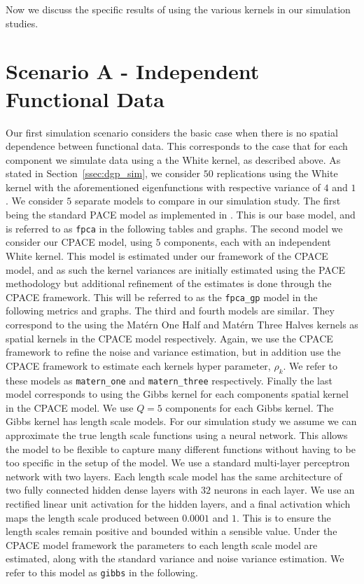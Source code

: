 Now we discuss the specific results of using the various kernels in our simulation studies. 

\section{Scenario A - Independent Functional Data \label{sec:sim_A}}
Our first simulation scenario considers the basic case when there is no spatial dependence between functional data.
This corresponds to the case that for each component we simulate data using a the White kernel, as described above.
As stated in Section~\ref{ssec:dgp_sim}, we consider $50$ replications using the White kernel with the aforementioned eigenfunctions with respective variance of $4$ and $1$. 
We consider $5$ separate models to compare in our simulation study.
The first being the standard PACE model as implemented in \citep{yao_functional_2005}.
This is our base model, and is referred to as \verb*|fpca| in the following tables and graphs. 
The second model we consider our CPACE model, using $5$ components, each with an independent White kernel.
This model is estimated under our framework of the CPACE model, and as such the kernel variances are initially estimated using the PACE methodology but additional refinement of the estimates is done through the CPACE framework.
This will be referred to as the \verb*|fpca_gp| model in the following metrics and graphs.
The third and fourth models are similar.
They correspond to the using the Mat\'ern One Half and Mat\'ern Three Halves kernels as spatial kernels in the CPACE model respectively.
Again, we use the CPACE framework to refine the noise and variance estimation, but in addition use the CPACE framework to estimate each kernels hyper parameter, $\rho_k$.
We refer to these models as \verb*|matern_one| and \verb*|matern_three| respectively.
Finally the last model corresponds to using the Gibbs kernel for each components spatial kernel in the CPACE model.
We use $Q=5$ components for each Gibbs kernel.
The Gibbs kernel has length scale models.
For our simulation study we assume we can approximate the true length scale functions using a neural network.
This allows the model to be flexible to capture many different functions without having to be too specific in the setup of the model.
We use a standard multi-layer perceptron network with two layers.
Each length scale model has the same architecture of two fully connected hidden dense layers with $32$ neurons in each layer.
We use an rectified linear unit activation for the hidden layers, and a final activation which maps the length scale produced between $0.0001$ and $1$.
This is to ensure the length scales remain positive and bounded within a sensible value.
Under the CPACE model framework the parameters to each length scale model are estimated, along with the standard variance and noise variance estimation.
We refer to this model as \verb*|gibbs| in the following.

